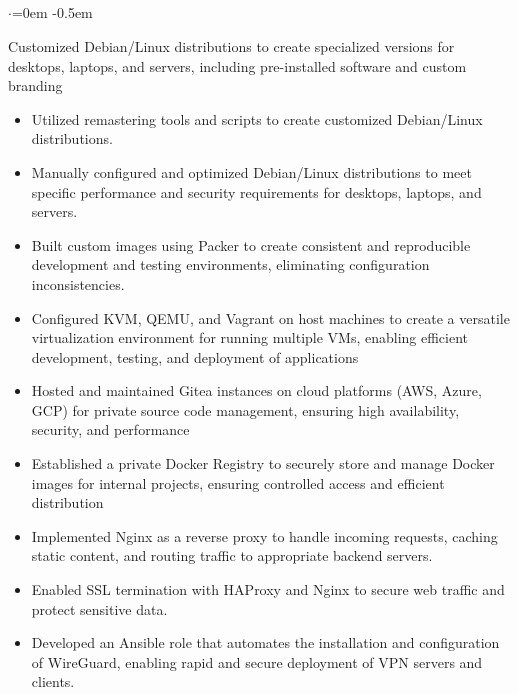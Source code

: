 \documentclass{article}
\begin{document}
\subsection*{}
\vspace{-2.6em}
\begin{list}{$\cdot$}{\leftmargin=0em} %
    \itemsep -0.5em \vspace{-0.5em} %
    \item Customized Debian/Linux distributions to create specialized versions for desktops, laptops, and servers, including pre-installed software  and custom branding
\end{list}
\vspace{-1.6em}
\begin{itemize}
    \item Utilized remastering tools and scripts to create customized Debian/Linux distributions.
    \item Manually configured and optimized Debian/Linux distributions to meet specific performance and security requirements for desktops, laptops, and servers.
    \item Built custom images using Packer to create consistent and reproducible development and testing environments, eliminating configuration inconsistencies.
    \item Configured KVM, QEMU, and Vagrant on host machines to create a versatile virtualization environment for running multiple VMs, enabling efficient development, testing, and deployment of applications
    \item Hosted and maintained Gitea instances on cloud platforms (AWS, Azure, GCP) for private source code management, ensuring high availability, security, and performance
    \item Established a private Docker Registry to securely store and manage Docker images for internal projects, ensuring controlled access and efficient distribution
    \item Implemented Nginx as a reverse proxy to handle incoming requests, caching static content, and routing traffic to appropriate backend servers.
    \item Enabled SSL termination with HAProxy and Nginx to secure web traffic and protect sensitive data.
    \item Developed an Ansible role that automates the installation and configuration of WireGuard, enabling rapid and secure deployment of VPN servers and clients.

\end{itemize}
\end{document}

